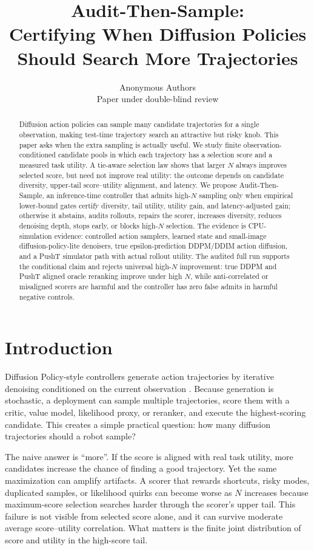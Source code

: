 \documentclass{article}
\title{Audit-Then-Sample:\\
Certifying When Diffusion Policies Should Search More Trajectories}
\author{Anonymous Authors\\Paper under double-blind review}
\newcommand{\ats}{Audit-Then-Sample}
\begin{document}
\maketitle

\begin{abstract}
Diffusion action policies can sample many candidate trajectories for a single observation, making test-time trajectory search an attractive but risky knob. This paper asks when the extra sampling is actually useful. We study finite observation-conditioned candidate pools in which each trajectory has a selection score and a measured task utility. A tie-aware selection law shows that larger $N$ always improves selected score, but need not improve real utility: the outcome depends on candidate diversity, upper-tail score--utility alignment, and latency. We propose \ats{}, an inference-time controller that admits high-$N$ sampling only when empirical lower-bound gates certify diversity, tail utility, utility gain, and latency-adjusted gain; otherwise it abstains, audits rollouts, repairs the scorer, increases diversity, reduces denoising depth, stops early, or blocks high-$N$ selection. The evidence is CPU-simulation evidence: controlled action samplers, learned state and small-image diffusion-policy-lite denoisers, true epsilon-prediction DDPM/DDIM action diffusion, and a PushT simulator path with actual rollout utility. The audited full run supports the conditional claim and rejects universal high-$N$ improvement: true DDPM and PushT aligned oracle reranking improve under high $N$, while anti-correlated or misaligned scorers are harmful and the controller has zero false admits in harmful negative controls.
\end{abstract}

\section{Introduction}

Diffusion Policy-style controllers generate action trajectories by iterative denoising conditioned on the current observation \citep{chi2023diffusionpolicy,ho2020ddpm,song2020ddim}. Because generation is stochastic, a deployment can sample multiple trajectories, score them with a critic, value model, likelihood proxy, or reranker, and execute the highest-scoring candidate. This creates a simple practical question: how many diffusion trajectories should a robot sample?

The naive answer is ``more''. If the score is aligned with real task utility, more candidates increase the chance of finding a good trajectory. Yet the same maximization can amplify artifacts. A scorer that rewards shortcuts, risky modes, duplicated samples, or likelihood quirks can become worse as $N$ increases because maximum-score selection searches harder through the scorer's upper tail. This failure is not visible from selected score alone, and it can survive moderate average score--utility correlation. What matters is the finite joint distribution of score and utility in the high-score tail.
\end{document}
